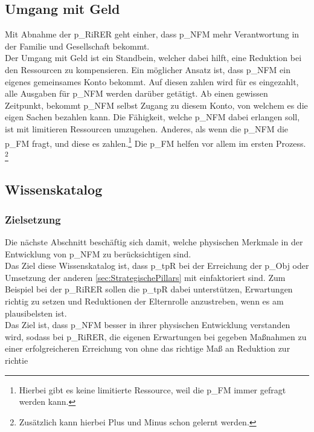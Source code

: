 \subsection{Umgang mit Geld}
Mit Abnahme der \gls{p_RiRER} geht einher, dass \gls{p_NFM} mehr Verantwortung in der Familie und Gesellschaft bekommt.\\

Der Umgang mit Geld ist ein Standbein, welcher dabei hilft, eine Reduktion bei den Ressourcen zu kompensieren. Ein möglicher Ansatz ist, dass \gls{p_NFM} ein eigenes gemeinsames Konto bekommt. Auf diesen zahlen wird für es eingezahlt, alle Ausgaben für \gls{p_NFM} werden darüber getätigt. Ab einen gewissen Zeitpunkt, bekommt \gls{p_NFM} selbst Zugang zu diesem Konto, von welchem es die eigen Sachen bezahlen kann. Die Fähigkeit, welche \gls{p_NFM} dabei erlangen soll, ist mit limitieren Ressourcen umzugehen. Anderes, als wenn die \gls{p_NFM} die \gls{p_FM} fragt, und diese es zahlen.\footnote{
	Hierbei gibt es keine limitierte Ressource, weil die \gls{p_FM} immer gefragt werden kann.
} Die \gls{p_FM} helfen vor allem im ersten Prozess. \footnote{
	Zusätzlich kann hierbei Plus und Minus schon gelernt werden.
}


\subsection{Wissenskatalog}
\subsubsection{Zielsetzung}
Die nächste Abschnitt beschäftig sich damit, welche physischen Merkmale in der Entwicklung von \gls{p_NFM} zu berücksichtigen sind.\\ 

Das Ziel diese Wissenskatalog ist, dass \gls{p_tpR} bei der Erreichung der \gls{p_Obj} oder Umsetzung der anderen \ref{sec:StrategischePillars} mit einfaktoriert sind. Zum Beispiel bei der \gls{p_RiRER} sollen die \gls{p_tpR} dabei unterstützen, Erwartungen richtig zu setzen und Reduktionen der Elternrolle anzustreben, wenn es am plausibelsten ist.\\

Das Ziel ist, dass \gls{p_NFM} besser in ihrer physischen Entwicklung verstanden wird, sodass bei \gls{p_RiRER}, die eigenen Erwartungen 
bei gegeben Maßnahmen zu einer erfolgreicheren Erreichung von  ohne 
das richtige Maß an Reduktion zur richtie 


